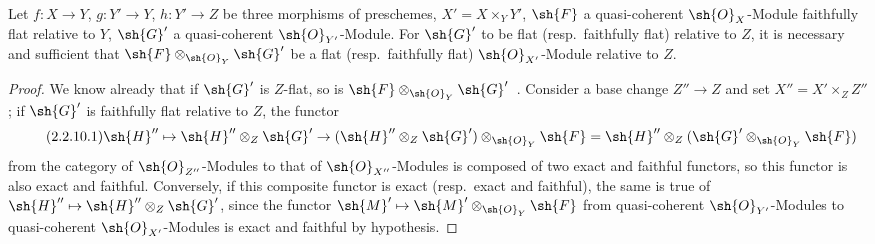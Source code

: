 \begin{proposition}[2.2.10]
\label{IV.2.2.10}
Let $f:X\to Y$, $g:Y'\to Y$, $h:Y'\to Z$ be three morphisms of preschemes, $X'=X\times_Y Y'$, $\sh{F}$ a quasi-coherent $\sh{O}_X$-Module faithfully flat relative to $Y$, $\sh{G}'$ a quasi-coherent $\sh{O}_{Y'}$-Module.
For $\sh{G}'$ to be flat \textnormal{(}resp.\ faithfully flat\textnormal{)} relative to $Z$, it is necessary and sufficient that $\sh{F}\otimes_{\sh{O}_Y}\sh{G}'$ be a flat \textnormal{(}resp.\ faithfully flat\textnormal{)} $\sh{O}_{X'}$-Module relative to $Z$.
\end{proposition}

\begin{proof}
We know already that if $\sh{G}'$ is $Z$-flat, so is $\sh{F}\otimes_{\sh{O}_Y}\sh{G}'$~.
Consider a base change $Z''\to Z$ and set $X''=X'\times_Z Z''$; if $\sh{G}'$ is faithfully flat relative to $Z$, the functor
\begin{equation}
\tag{2.2.10.1}
\label{IV.2.2.10.1}
\sh{H}''\mapsto\sh{H}''\otimes_Z\sh{G}'\to(\sh{H}''\otimes_Z\sh{G}')\otimes_{\sh{O}_Y}\sh{F}=\sh{H}''\otimes_Z(\sh{G}'\otimes_{\sh{O}_Y}\sh{F})
\end{equation}
from the category of $\sh{O}_{Z''}$-Modules to that of $\sh{O}_{X''}$-Modules is composed of two exact and faithful functors, so this functor is also exact and faithful.
Conversely, if this composite functor is exact \textnormal{(}resp.\ exact and faithful\textnormal{)}, the same is true of $\sh{H}''\mapsto\sh{H}''\otimes_Z\sh{G}'$, since the functor $\sh{M}'\mapsto\sh{M}'\otimes_{\sh{O}_Y}\sh{F}$ from quasi-coherent $\sh{O}_{Y'}$-Modules to quasi-coherent $\sh{O}_{X'}$-Modules is exact and faithful by hypothesis.
\end{proof}

